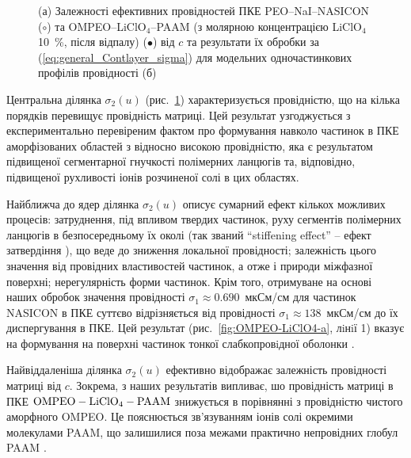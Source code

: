 \documentclass[twoside,a4paper,14pt]{vakaref}
\begin{document}
\begin{figure}[bt]
\begin{subfigure}[c]{0.38\textwidth}
		\caption{} \label{fig:OMPEO-LiClO4-b}
	\end{subfigure}
	\caption{\label{fig:PEO-NaI} 
		(а) Залежності ефективних провідностей ПКЕ PEO--NaI--NASICON \cite{Przl1995} ($\circ$) та OMPEO--LiClO$_4$--PAAM (з молярною концентрацією LiClO$_4$ 10~\%, після відпалу)
		\cite{Wiec1994} ($\bullet$) від $c$ та результати їх обробки за (\ref{eq:general_Contlayer_sigma}) для модельних одночастинкових профілів провідності (б)}
\vspace{-10pt}
\end{figure}

Центральна ділянка $\sigma_2(u)$ (рис.~\ref{fig:OMPEO-LiClO4-b}) характеризується провідністю, що на кілька порядків перевищує провідність матриці. Цей результат узгоджується з експериментально перевіреним фактом \cite{nanocomp2008} про формування навколо частинок в ПКЕ аморфізованих областей з відносно високою провідністю, яка є результатом підвищеної сегментарної гнучкості полімерних ланцюгів та, відповідно, підвищеної рухливості іонів розчиненої солі в цих областях. 

Найближча до ядер  ділянка $\sigma_2(u)$ описує сумарний ефект кількох можливих процесів: затруднення, під впливом твердих частинок, руху сегментів полімерних ланцюгів  в безпосередньому їх околі (так званий ``stiffening effect'' -- ефект затвердіння \cite{Wiec1994}), що веде до зниження локальної провідності; залежність цього значення від провідних властивостей частинок, а отже і природи міжфазної поверхні; нерегулярність форми частинок. Крім того, отримуване на основі наших обробок значення провідності $\sigma_1\approx 0.690$~мкСм/см для частинок NASICON в ПКЕ суттєво відрізняється від провідності $\sigma_1\approx 138$~мкСм/см до їх диспергування в ПКЕ. Цей результат (рис.~\ref{fig:OMPEO-LiClO4-a}, лiнiї 1) вказує на формування на поверхні частинок тонкої слабкопровiдної оболонки \cite{Ploch1988}. 

Найвіддаленіша ділянка $\sigma_2(u)$ ефективно відображає залежність провідності матриці від $c$. Зокрема, з наших результатів випливає, шо провідність  матриці в  ПКЕ $\rm OMPEO-LiClO_4-PAAM$ знижується в порівнянні з провідністю чистого аморфного OMPEO. Це пояснюється зв'язуванням іонів солі окремими молекулами PAAM, що залишилися  поза межами практично непровідних глобул PAAM \cite{Wiec1994}.
\end{document}
